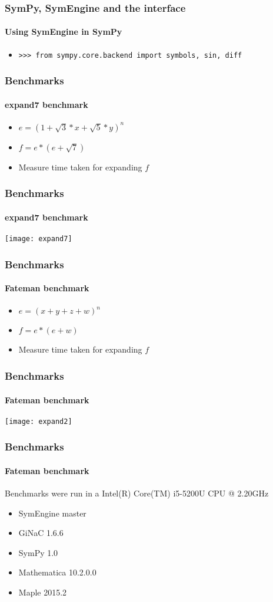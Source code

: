 \documentclass{beamer}
\begin{document}
\begin{frame}[fragile]
\frametitle{SymPy, SymEngine and the interface}
\framesubtitle{Using SymEngine in SymPy}
\begin{itemize}
\item
\begin{verbatim}
>>> from sympy.core.backend import symbols, sin, diff
\end{verbatim}
\end{itemize}
\end{frame}



\begin{frame}
\frametitle{Benchmarks}
\framesubtitle{expand7 benchmark}
\begin{itemize}
\item $ e = (1+\sqrt{3}*x+ \sqrt{5}*y)^n $
\item $ f = e*(e+\sqrt{7}) $
\item Measure time taken for expanding $f$
\end{itemize}
\end{frame}



\begin{frame}
\frametitle{Benchmarks}
\framesubtitle{expand7 benchmark}
\texttt{[image: expand7]}
\end{frame}



\begin{frame}
\frametitle{Benchmarks}
\framesubtitle{Fateman benchmark}
\begin{itemize}
\item $ e = (x + y + z + w) ^ n $
\item $ f = e * (e + w) $
\item Measure time taken for expanding $f$
\end{itemize}
\end{frame}


\begin{frame}
\frametitle{Benchmarks}
\framesubtitle{Fateman benchmark}
\texttt{[image: expand2]}
\end{frame}



\begin{frame}
\frametitle{Benchmarks}
\framesubtitle{Fateman benchmark}
Benchmarks were run in a Intel(R) Core(TM) i5-5200U CPU @ 2.20GHz
\begin{itemize}
 \item SymEngine master
 \item GiNaC 1.6.6
 \item SymPy 1.0
 \item Mathematica 10.2.0.0
 \item Maple 2015.2
\end{itemize}
\end{frame}
\end{document}
